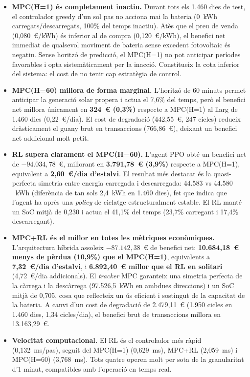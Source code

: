 \documentclass[a4paper,12pt,twoside]{ThesisStyle}
\begin{document}
\begin{itemize}
    \item \textbf{MPC(H=1) és completament inactiu.} Durant tots els 1.460 dies de test, el controlador greedy d'un sol pas no acciona mai la bateria (0~kWh carregats/descarregats, 100\% del temps inactiu). Atès que el preu de venda (0,080~€/kWh) és inferior al de compra (0,120~€/kWh), el benefici net immediat de qualsevol moviment de bateria sense excedent fotovoltaic és negatiu. Sense horitzó de predicció, el MPC(H=1) no pot anticipar períodes favorables i opta sistemàticament per la inacció. Constitueix la cota inferior del sistema: el cost de no tenir cap estratègia de control.

    \item \textbf{MPC(H=60) millora de forma marginal.} L'horitzó de 60 minuts permet anticipar la generació solar propera i actua el 7,6\% del temps, però el benefici net millora únicament en \textbf{324~€ (0,3\%)} respecte a MPC(H=1) al llarg de 1.460 dies (0,22~€/dia). El cost de degradació (442,55~€, 247 cicles) redueix dràsticament el guany brut en transaccions (766,86~€), deixant un benefici net addicional molt petit.

    \item \textbf{RL supera clarament el MPC(H=60).} L'agent PPO obté un benefici net de $-94.034{,}78$~€, millorant en \textbf{3.791,78~€ (3,9\%)} respecte a MPC(H=1), equivalent a \textbf{2,60~€/dia d'estalvi}. El resultat més destacat és la quasi-perfecta simetria entre energia carregada i descarregada: 44.583 vs 44.580 ~kWh (diferència de tan sols 2,4~kWh en 1.460 dies), fet que indica que l'agent ha après una \textit{policy} de ciclatge estructuralment estable. El RL manté un SoC mitjà de 0,230 i actua el 41,1\% del temps (23,7\% carregant i 17,4\% descarregant).

    \item \textbf{MPC+RL és el millor en totes les mètriques econòmiques.} L'arquitectura híbrida assoleix $-87.142{,}38$~€ de benefici net: \textbf{10.684,18~€ menys de pèrdua (10,9\%) que el MPC(H=1)}, equivalents a \textbf{7,32~€/dia d'estalvi}, i \textbf{6.892,40~€ millor que el RL en solitari} (4,72~€/dia addicionals). El \textit{tracker} MPC garanteix una simetria perfecta de la càrrega i la descàrrega (97.526,5~kWh en ambdues direccions) i un SoC mitjà de 0,705, cosa que reflecteix un ús eficient i sostingut de la capacitat de la bateria. A canvi d'un cost de degradació de 2.479,11~€ (1.950 cicles en 1.460 dies, 1,34 cicles/dia), el benefici brut de transaccions millora en 13.163,29~€.

    \item \textbf{Velocitat computacional.} El RL és el controlador més ràpid (0,132~ms/pas), seguit del MPC(H=1) (0,629~ms), MPC+RL (2,059~ms) i MPC(H=60) (3,768~ms). Tots quatre operen molt per sota de la granularitat d'1 minut, compatibles amb l'operació en temps real.
\end{itemize}
\end{document}
